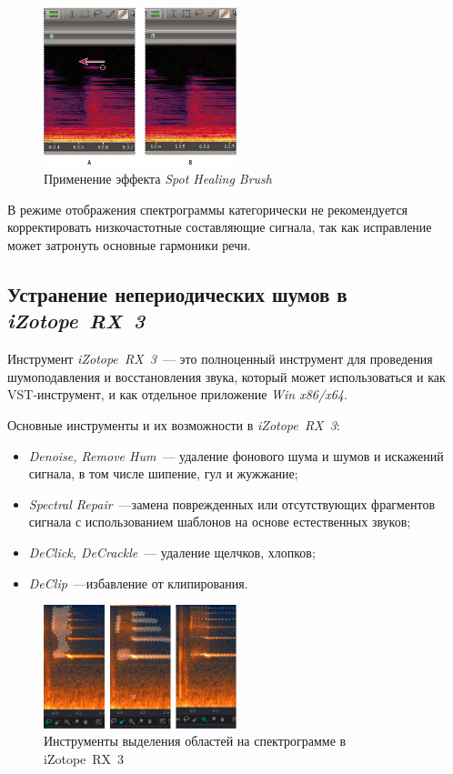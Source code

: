 \documentclass[oneside, final, 14pt]{extreport}
\begin{document}
\begin{figure}[h]
\centering
\includegraphics[width=0.5\textwidth]{pic-spectroedit-02}
\caption{Применение эффекта \textit{Spot Healing Brush}}
\label{pic-spectroedit-02}
\end{figure}

В режиме отображения спектрограммы категорически не рекомендуется корректировать низкочастотные составляющие сигнала, так как исправление может затронуть основные гармоники речи.

\subsection{Устранение непериодических шумов в \emph{iZotope~RX~3}}
Инструмент \emph{iZotope~RX~3}~--- это полноценный инструмент для проведения шумоподавления и восстановления звука, который может использоваться и как VST-инструмент, и как отдельное приложение \emph{Win x86/x64}.

Основные инструменты и их возможности в \emph{iZotope~RX~3}:
\begin{itemize}
  \item \emph{Denoise, Remove Hum}~--- удаление фонового шума и шумов и искажений сигнала, в том числе шипение, гул и жужжание;
  \item \emph{Spectral Repair}~---замена поврежденных или отсутствующих фрагментов сигнала с использованием шаблонов на основе естественных звуков;
  \item \emph{DeClick, DeCrackle}~--- удаление щелчков, хлопков;
  \item \emph{DeClip}~---избавление от клипирования.
\end{itemize}

\begin{figure}[h]
\centering
\includegraphics[width=0.5\textwidth]{pic-spectroedit-03}
\caption{Инструменты выделения областей на спектрограмме в iZotope~RX~3}
\label{pic-spectroedit-03}
\end{figure}
\end{document}
